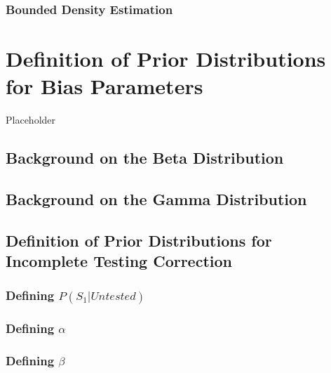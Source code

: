 \documentclass[12pt,twoside]{smiththesis}
\begin{document}
\hypertarget{bounded-density-estimation}{%
\subsection{Bounded Density Estimation}\label{bounded-density-estimation}}

\hypertarget{definition-of-prior-distributions-for-bias-parameters}{%
\chapter{Definition of Prior Distributions for Bias Parameters}\label{definition-of-prior-distributions-for-bias-parameters}}

Placeholder

\hypertarget{background-on-the-beta-distribution}{%
\section{Background on the Beta Distribution}\label{background-on-the-beta-distribution}}

\hypertarget{background-on-the-gamma-distribution}{%
\section{Background on the Gamma Distribution}\label{background-on-the-gamma-distribution}}

\hypertarget{definition-of-prior-distributions-for-incomplete-testing-correction}{%
\section{Definition of Prior Distributions for Incomplete Testing Correction}\label{definition-of-prior-distributions-for-incomplete-testing-correction}}

\hypertarget{defining-ps_1untested}{%
\subsection{\texorpdfstring{Defining \(P(S_1|Untested)\)}{Defining P(S\_1\textbar Untested)}}\label{defining-ps_1untested}}

\hypertarget{defining-alpha}{%
\subsection{\texorpdfstring{Defining \(\alpha\)}{Defining \textbackslash alpha}}\label{defining-alpha}}

\hypertarget{defining-beta}{%
\subsection{\texorpdfstring{Defining \(\beta\)}{Defining \textbackslash beta}}\label{defining-beta}}
\end{document}
